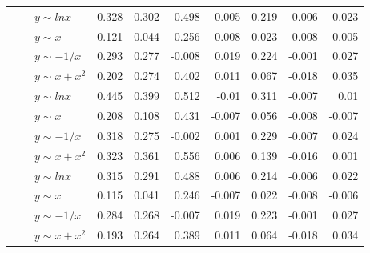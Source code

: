 \begin{table*}[!ht]
\begin{tabular}{| l | l | l | r | r | r | r | r | r | r | }
&\multirow{4}{*}{\metrictwor{}}
&$y\sim lnx$&\cellcolor[rgb]{.7,.7,.7}0.328&\cellcolor[rgb]{.7,.7,.7}0.302&\cellcolor[rgb]{.7,.7,.7}0.498&\cellcolor[rgb]{.9,.9,.9}0.005&\cellcolor[rgb]{.9,.9,.9}0.219&-0.006&\cellcolor[rgb]{.9,.9,.9}0.023  \\ \cline{3-10}
&&$y\sim x$&\cellcolor[rgb]{.9,.9,.9}0.121&\cellcolor[rgb]{.9,.9,.9}0.044&\cellcolor[rgb]{.7,.7,.7}0.256&-0.008&\cellcolor[rgb]{.9,.9,.9}0.023&-0.008&-0.005  \\ \cline{3-10}
&&$y\sim -1/x$&\cellcolor[rgb]{.7,.7,.7}0.293&\cellcolor[rgb]{.7,.7,.7}0.277&-0.008&\cellcolor[rgb]{.9,.9,.9}0.019&\cellcolor[rgb]{.9,.9,.9}0.224&-0.001&\cellcolor[rgb]{.9,.9,.9}0.027  \\ \cline{3-10}
&&$y\sim x+x^2$&\cellcolor[rgb]{.9,.9,.9}0.202&\cellcolor[rgb]{.7,.7,.7}0.274&\cellcolor[rgb]{.7,.7,.7}0.402&\cellcolor[rgb]{.9,.9,.9}0.011&\cellcolor[rgb]{.9,.9,.9}0.067&-0.018&\cellcolor[rgb]{.9,.9,.9}0.035  \\ \cline{2-10}

&\multirow{4}{*}{\metrictwok{}}
&$y\sim lnx$&\cellcolor[rgb]{.7,.7,.7}0.445&\cellcolor[rgb]{.7,.7,.7}0.399&\cellcolor[rgb]{.5,.5,.5}0.512&-0.01&\cellcolor[rgb]{.7,.7,.7}0.311&-0.007&\cellcolor[rgb]{.9,.9,.9}0.01  \\ \cline{3-10}
&&$y\sim x$&\cellcolor[rgb]{.9,.9,.9}0.208&\cellcolor[rgb]{.9,.9,.9}0.108&\cellcolor[rgb]{.7,.7,.7}0.431&-0.007&\cellcolor[rgb]{.9,.9,.9}0.056&-0.008&-0.007  \\ \cline{3-10}
&&$y\sim -1/x$&\cellcolor[rgb]{.7,.7,.7}0.318&\cellcolor[rgb]{.7,.7,.7}0.275&-0.002&\cellcolor[rgb]{.9,.9,.9}0.001&\cellcolor[rgb]{.9,.9,.9}0.229&-0.007&\cellcolor[rgb]{.9,.9,.9}0.024  \\ \cline{3-10}
&&$y\sim x+x^2$&\cellcolor[rgb]{.7,.7,.7}0.323&\cellcolor[rgb]{.7,.7,.7}0.361&\cellcolor[rgb]{.5,.5,.5}0.556&\cellcolor[rgb]{.9,.9,.9}0.006&\cellcolor[rgb]{.9,.9,.9}0.139&-0.016&\cellcolor[rgb]{.9,.9,.9}0.001  \\ \cline{2-10}

&\multirow{4}{*}{\metrictwop{}}
&$y\sim lnx$&\cellcolor[rgb]{.7,.7,.7}0.315&\cellcolor[rgb]{.7,.7,.7}0.291&\cellcolor[rgb]{.7,.7,.7}0.488&\cellcolor[rgb]{.9,.9,.9}0.006&\cellcolor[rgb]{.9,.9,.9}0.214&-0.006&\cellcolor[rgb]{.9,.9,.9}0.022  \\ \cline{3-10}
&&$y\sim x$&\cellcolor[rgb]{.9,.9,.9}0.115&\cellcolor[rgb]{.9,.9,.9}0.041&\cellcolor[rgb]{.9,.9,.9}0.246&-0.007&\cellcolor[rgb]{.9,.9,.9}0.022&-0.008&-0.006  \\ \cline{3-10}
&&$y\sim -1/x$&\cellcolor[rgb]{.7,.7,.7}0.284&\cellcolor[rgb]{.7,.7,.7}0.268&-0.007&\cellcolor[rgb]{.9,.9,.9}0.019&\cellcolor[rgb]{.9,.9,.9}0.223&-0.001&\cellcolor[rgb]{.9,.9,.9}0.027  \\ \cline{3-10}
&&$y\sim x+x^2$&\cellcolor[rgb]{.9,.9,.9}0.193&\cellcolor[rgb]{.7,.7,.7}0.264&\cellcolor[rgb]{.7,.7,.7}0.389&\cellcolor[rgb]{.9,.9,.9}0.011&\cellcolor[rgb]{.9,.9,.9}0.064&-0.018&\cellcolor[rgb]{.9,.9,.9}0.034  \\ \hline

\end{tabular}
\end{table*}